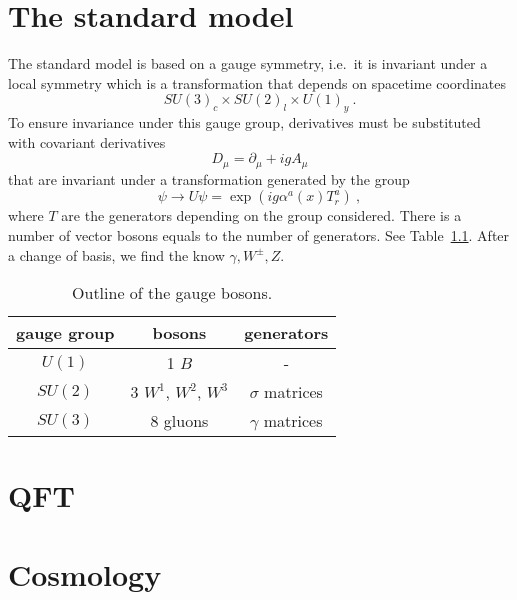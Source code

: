 \appendix

\chapter{The standard model}

    The standard model is based on a gauge symmetry, i.e.~it is invariant under a local symmetry which is a transformation that depends on spacetime coordinates 
    \begin{equation*}
        SU(3)_c \times SU(2)_l \times U(1)_y ~.
    \end{equation*}
    To ensure invariance under this gauge group, derivatives must be substituted with covariant derivatives 
    \begin{equation*}
        D_\mu = \partial_\mu + i g A_\mu 
    \end{equation*}
    that are invariant under a transformation generated by the group 
    \begin{equation*}
        \psi \rightarrow U \psi = \exp(i g \alpha^a(x) T^a_r) ~,
    \end{equation*}
    where $T$ are the generators depending on the group considered. There is a number of vector bosons equals to the number of generators. See Table~\ref{tab:bos}. After a change of basis, we find the know $\gamma, W^\pm, Z$.
    
    \begin{table}[h!]
        \centering
        \begin{tabular}{c | c | c}
            gauge group  & bosons & generators \\
            \hline
            $U(1)$ & 1 $B$ & - \\ 
            $SU(2)$ & 3 $W^1$, $W^2$, $W^3$ & $\sigma$ matrices \\ 
            $SU(3)$ & 8 gluons & $\gamma$ matrices\\ 
        \end{tabular}
        \caption{Outline of the gauge bosons.}
        \label{tab:bos}
    \end{table}

\chapter{QFT}

\chapter{Cosmology}
